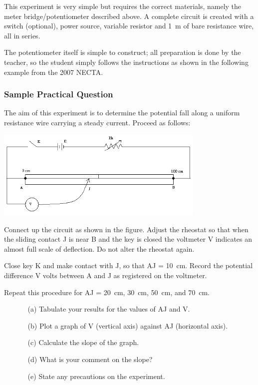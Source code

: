 This experiment is very simple but requires the correct materials, namely the
meter bridge/potentiometer described above. A complete circuit is created with a switch
(optional), power source, variable resistor and 1~m of bare resistance wire, all in series.

The potentiometer itself is simple to construct; all preparation is done by the teacher, so
the student simply follows the instructions as shown in the following example from the 2007 NECTA.

\subsubsection{Sample Practical Question}

The aim of this experiment is to determine the potential fall along a uniform
resistance wire carrying a steady current. Proceed as follows:

\begin{center}
\includegraphics[width=10cm]{./img/meter-bridge-1.png}
\end{center}


Connect up the circuit as shown in the figure. Adjust the rheostat so that when the sliding
contact J is near B and the key is closed the voltmeter V indicates an almost full scale
of deflection. Do not alter the rheostat again.

Close key K and make contact with J, so that AJ = 10~cm. Record the potential
difference V volts between A and J as registered on the voltmeter.

Repeat this procedure for AJ = 20~cm, 30~cm, 50~cm, and 70~cm.

\begin{enumerate}
\item[]
\begin{enumerate}
\item[(a)]{Tabulate your results for the values of AJ and V.}
\item[(b)]{Plot a graph of V (vertical axis) against AJ (horizontal axis).}
\item[(c)]{Calculate the slope of the graph.}
\item[(d)]{What is your comment on the slope?}
\item[(e)]{State any precautions on the experiment.}
\end{enumerate}
\end{enumerate}

